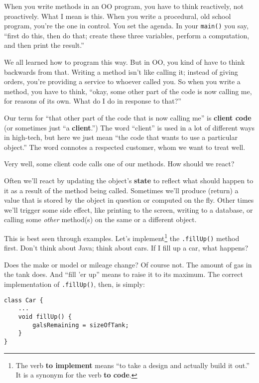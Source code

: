When you write methods in an OO program, you have to think reactively, not
proactively. What I mean is this. When you write a procedural, old school
program, you're the one in control. You set the agenda. In your
\texttt{main()} you say, ``first do this, then do that; create these three
variables, perform a computation, and then print the result.''

We all learned how to program this way. But in OO, you kind of have to think
backwards from that. Writing a method isn't like calling it; instead of giving
orders, you're providing a service to whoever called you. So when you write a
method, you have to think, ``okay, some other part of the code is now calling
me, for reasons of its own. What do I do in response to that?''

Our term for ``that other part of the code that is now calling me'' is
\textbf{client code} (or sometimes just ``a \textbf{client}.'') The word
``client'' is used in a lot of different ways in high-tech, but here we just
mean ``the code that wants to use a particular object.'' The word connotes a
respected customer, whom we want to treat well.

Very well, some client code calls one of our methods. How should we react?

Often we'll react by updating the object's \textbf{state} to reflect what
should happen to it as a result of the method being called. Sometimes we'll
produce (return) a value that is stored by the object in question or
computed on the fly. Other times we'll trigger some side effect, like printing
to the screen, writing to a database, or calling some \textit{other} method(s)
on the same or a different object.

This is best seen through examples. Let's implement\footnote{The verb
\textbf{to implement} means ``to take a design and actually build it out.'' It
is a synonym for the verb \textbf{to code}.} the \texttt{.fillUp()} method
first. Don't think about Java; think about cars. If I fill up a car, what
happens?

Does the make or model or mileage change? Of course not. The amount of gas in
the tank does. And ``fill 'er up'' means to raise it to its maximum. The
correct implementation of \texttt{.fillUp()}, then, is simply:

\begin{Verbatim}[samepage=true,fontsize=\scriptsize,frame=single]
class Car {
    ...
    void fillUp() {
        galsRemaining = sizeOfTank;
    }
}
\end{Verbatim}

